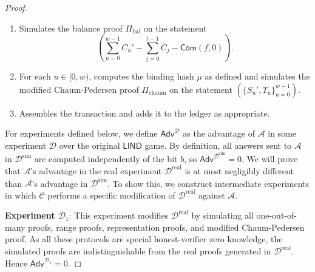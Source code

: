 \documentclass{llncs}
\newcommand{\func}[1]{\mathsf{#1}}
\newcommand{\com}{\func{Com}}
\begin{document}
\begin{proof}
\begin{itemize}
\begin{enumerate}
\begin{enumerate}
\begin{enumerate}
                \item Samples a random input used to produce a symmetric encryption key $\func{AEADKeyGen} \to k_{\text{enc}}$.
                \item Simulates the value encryption by selecting random $\widetilde{v}$ of the proper length, and encrypting it to produce $$\func{AEADEncrypt}(k_{\text{enc}},\texttt{val},\widetilde{v}) \to \overline{v}_j.$$
                \item Simulates the memo encryption by selecting random $\widetilde{m}$ of the proper length, and encrypting it to produce $$\func{AEADEncrypt}(k_{\text{enc}},\texttt{memo},\widetilde{m}) \to \overline{m}_j.$$
                \item Simulates a range proof $(\Pi_{\text{rp}})_j$ on the statement $(\overline{C}_j)$.
            \end{enumerate}
        \end{enumerate}
        \item Simulates the balance proof $\Pi_{\text{bal}}$ on the statement $$\left(\sum_{u=0}^{w-1} C_u' - \sum_{j=0}^{t-1} \overline{C}_j - \com(f,0)\right).$$
        \item For each $u \in [0,w)$, computes the binding hash $\mu$ as defined and simulates the modified Chaum-Pedersen proof $\Pi_{\text{chaum}}$ on the statement $(\{S_u', T_u\}_{u=0}^{w-1})$.
        \item Assembles the transaction and adds it to the ledger as appropriate.
    \end{enumerate}
\end{itemize}

For experiments defined below, we define $\func{Adv}^{\mathcal{D}}$ as the advantage of $\mathcal{A}$ in some experiment $\mathcal{D}$ over the original $\func{LIND}$ game.
By definition, all answers sent to $\mathcal{A}$ in $\mathcal{D}^{\text{sim}}$ are computed independently of the bit $b$, so $\func{Adv}^{\mathcal{D}^{\text{sim}}} = 0$. We will prove that $\mathcal{A}$'s advantage in the real experiment $\mathcal{D}^{\text{real}}$ is at most negligibly different than $\mathcal{A}$'s advantage in $\mathcal{D}^{\text{sim}}$.
To show this, we construct intermediate experiments in which $\mathcal{C}$ performs a specific modification of $\mathcal{D}^{\text{real}}$ against $\mathcal{A}$.

\textbf{Experiment $\mathcal{D}_1$}: This experiment modifies $\mathcal{D}^{\text{real}}$ by simulating all one-out-of-many proofs, range proofs, representation proofs, and modified Chaum-Pedersen proof.
As all these protocols are special honest-verifier zero knowledge, the simulated proofs are indistinguishable from the real proofs generated in $\mathcal{D}^{\text{real}}$.
Hence $\func{Adv}^{\mathcal{D}_1} = 0$.


\end{proof}
\end{document}
